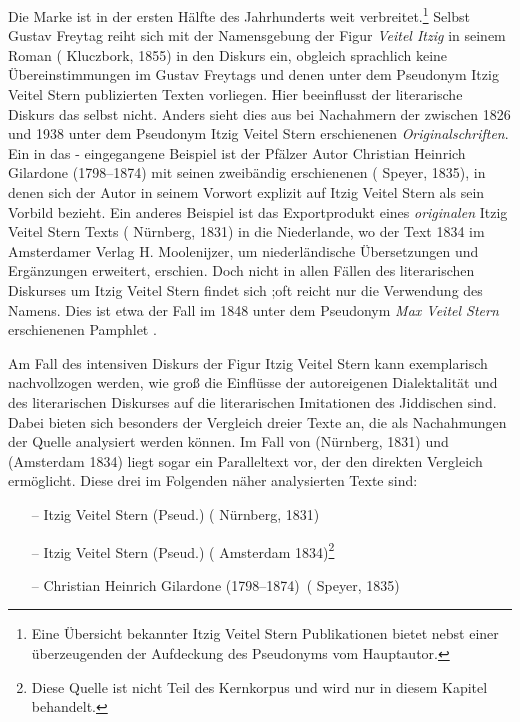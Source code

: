  Die Marke  ist in der ersten Hälfte des Jahrhunderts weit verbreitet.\footnote{Eine Übersicht bekannter Itzig Veitel Stern Publikationen bietet \citealt{Huggele2016} nebst einer überzeugenden der Aufdeckung des Pseudonyms vom Hauptautor.} Selbst Gustav Freytag reiht sich mit der Namensgebung der Figur \textit{Veitel Itzig} in seinem Roman  ( Kluczbork, 1855) in den Dis­kurs ein, obgleich sprachlich keine Übereinstimmungen im \hai{{\LiJi}} Gustav Freytags und denen unter dem Pseudonym Itzig Veitel Stern publizierten Texten vorliegen. Hier beeinflusst der literarische Diskurs das \hai{{\LiJi}} selbst nicht. Anders sieht dies aus bei Nachahmern der  zwischen 1826 und 1938 unter dem Pseudonym Itzig Veitel Stern erschienenen \textit{Originalschriften}. Ein in das - eingegangene Beispiel ist der Pfälzer Autor Christian Heinrich Gilardone (1798–1874)  mit seinen zweibändig erschienenen  ( Speyer, 1835), in denen sich der Autor in seinem Vorwort explizit auf Itzig Veitel Stern als sein Vorbild bezieht. Ein anderes Beispiel ist das Exportprodukt eines \textit{originalen} Itzig Veitel Stern Texts ( Nürnberg, 1831) in die Niederlande, wo der Text 1834 im Amsterdamer Verlag H. Moolenijzer, um niederländische Übersetzungen und Ergänzungen erweitert, erschien. Doch nicht in allen Fällen des literarischen Diskurses um Itzig Veitel Stern findet sich \hai{{\LiJi}};oft reicht nur die Verwendung des Namens. Dies ist etwa der Fall im 1848 unter dem Pseudonym \textit{Max Veitel Stern} erschienenen Pamphlet . 

Am Fall des intensiven Diskurs der Figur Itzig Veitel Stern kann exemplarisch nachvollzogen werden, wie groß die Einflüsse der autoreigenen Dialektalität und des literarischen Dis­kurses auf die literarischen Imitationen des Jiddischen sind. Dabei bieten sich besonders der Vergleich dreier Texte an, die als Nachahmungen der Quelle  analysiert werden können. Im Fall von  (Nürnberg, 1831) und  (Amsterdam 1834) liegt sogar ein Paralleltext vor, der den direkten Vergleich ermöglicht. Diese drei im Folgenden näher analysierten Texte sind:

\begin{itemize}
\item [–] Itzig Veitel Stern (Pseud.)  ( Nürnberg, 1831)
\item [–] Itzig Veitel Stern (Pseud.)  ( Amsterdam 1834)\footnote{Diese Quelle ist nicht Teil des Kernkorpus und wird nur in diesem Kapitel behandelt.}
\item [–] Christian Heinrich Gilardone (1798–1874)\, ( Speyer, 1835)
\end{itemize}

